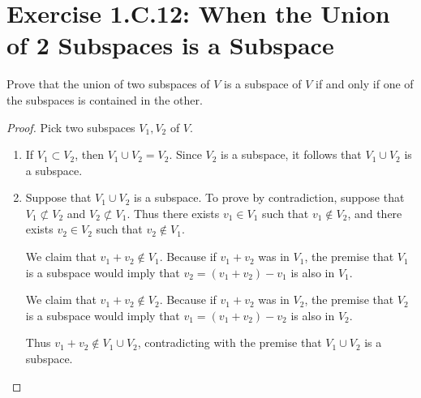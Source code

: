 \section{Exercise 1.C.12: When the Union of 2 Subspaces is a Subspace}
Prove that the union of two subspaces of $V$ is a subspace of $V$ if and only if one of the subspaces is contained in the other.
\begin{proof}
Pick two subspaces $V_1, V_2$ of $V$.
\begin{enumerate}
\item If $V_1\subset V_2$, then $V_1\cup V_2=V_2$. Since $V_2$ is a subspace, it follows that $V_1\cup V_2$ is a subspace.
\item Suppose that $V_1\cup V_2$ is a subspace. To prove by contradiction, suppose that $V_1\not\subset V_2$ and $V_2\not\subset V_1$. Thus there exists $v_1\in V_1$ such that $v_1\notin V_2$, and there exists $v_2\in V_2$ such that $v_2\notin V_1$.

We claim that $v_1+v_2\notin V_1$. Because if $v_1+v_2$ was in $V_1$, the premise that $V_1$ is a subspace would imply that $v_2=(v_1+v_2)-v_1$ is also in $V_1$.

We claim that $v_1+v_2\notin V_2$. Because if $v_1+v_2$ was in $V_2$, the premise that $V_2$ is a subspace would imply that $v_1=(v_1+v_2)-v_2$ is also in $V_2$.

Thus $v_1+v_2\notin V_1\cup V_2$, contradicting with the premise that $V_1\cup V_2$ is a subspace.
\end{enumerate}
\end{proof}

